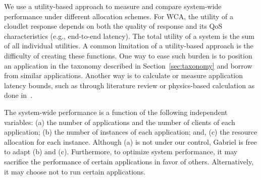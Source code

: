 We use a utility-based approach to measure and compare system-wide
performance under different allocation schemes. For WCA, the utility
of a cloudlet response depends on both the quality of response and its
QoS characteristics (e.g., end-to-end latency). The total utility of a
system is the sum of all individual utilities. A common limitation of
a utility-based approach is the difficulty of creating these
functions. One way to ease such burden is to position an application
in the taxonomy described in Section~\ref{sec:taxonomy} and borrow
from similar applications. Another way is to calculate or measure
application latency bounds, such as through literature review or
physics-based calculation as done in~\cite{Chen2017}.

The system-wide performance is a function of the following independent
variables: (a) the number of applications and the number of clients of
each application; (b) the number of instances of each application;
and, (c) the resource allocation for each instance.  Although (a) is
not under our control, Gabriel is free to adapt (b) and (c).
Furthermore, to optimize system performance, it may sacrifice the
performance of certain applications in favor of others.
Alternatively, it may choose not to run certain applications.


